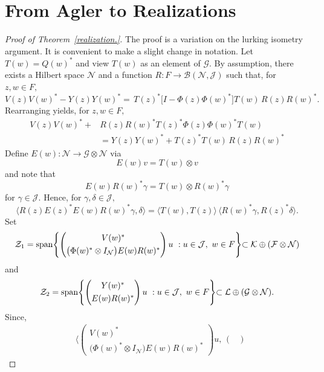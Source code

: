 \documentclass[a4paper,reqno,index]{amsart}
\numberwithin{equation}{section}
\newcommand{\LK}{\mathcal{K}}
\theoremstyle{definition}
\begin{document}
\section{From Agler to Realizations} \label{appendLurking}


\begin{proof}[Proof of Theorem~\ref{realization.}] 
The proof is a variation on the lurking isometry argument.
It is convenient to make a slight change in notation. Let $T(w)=Q(w)^*$ and 
view $T(w)$ as an element of $\mathcal{G}$. 
By assumption, there exists a Hilbert space $\mathcal{N}$ and a function 
$R:F\to\mathcal{B}(\mathcal{N}, \mathcal{J})$ such that, for $z, w\in F,$
\[
  V(z)V(w)^*-Y(z)Y(w)^*= \, T(z)^* \big[I-\Phi(z)\Phi(w)^*\big]T(w) \, R(z)R(w)^*.
\]
Rearranging yields, for $z,w\in F,$ 
\begin{equation*} %
\begin{split}  
  V(z)V(w)^*+ & R(z)R(w)^*T(z)^*\Phi(z)\Phi(w)^*T(w)
\\[3pt] & = Y(z)Y(w)^*+ T(z)^* T(w)\, R(z)R(w)^*
\end{split}
\end{equation*}
Define $E(w):\mathcal{N}\to \mathcal{G}\otimes \mathcal{N}$ via
\[
 E(w) v =  T(w)\otimes v
\]
 and note that 
\[
   E(w)R(w)^* \gamma = T(w)\otimes R(w)^* \gamma 
\]
for $\gamma\in \mathcal{J}.$ Hence, for $\gamma,\delta\in \mathcal{J},$
\[
  \langle  R(z) E(z)^* E(w) R(w)^*  \gamma,\delta \rangle
  = \langle  T(w),T(z) \rangle \, \langle R(w)^* \gamma, R(z)^* \delta\rangle.
\]
 Set 
\[
 \mathcal{Z}_1=\textup{span}\Biggl\{\begin{pmatrix}
V(w)^* \\[3pt]
\big(\Phi(w)^*\otimes I_{\mathcal{N}}\big)E(w)R(w)^*
\end{pmatrix}u\ : u\in\mathcal{J},\  w\in F  \Biggl\}\subset \LK \oplus (\mathcal{F}\otimes\mathcal{N}) 
\]
 and 
\[\mathcal{Z}_2=\textup{span}\Biggl\{\begin{pmatrix}
Y(w)^* \\[3pt]
E(w)R(w)^*
\end{pmatrix}u\ : u\in\mathcal{J},\  w\in F  \Biggl\}\subset \mathcal{L}\oplus (\mathcal{G}\otimes\mathcal{N}) .
\]
Since, 
\begin{align*}
 & \Bigg\langle  \begin{pmatrix}
V(w)^* \\[3pt]
\big(\Phi(w)^*\otimes I_{\mathcal{N}}\big)E(w)R(w)^*
\end{pmatrix} u, \, \begin{pmatrix}

\end{pmatrix}
\end{align*}
\end{proof}
\end{document}
